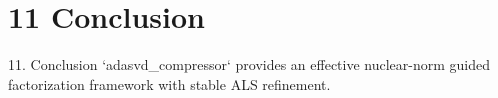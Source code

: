 \section{11 Conclusion}

 11. Conclusion
`adasvd\_compressor` provides an effective nuclear-norm guided factorization framework with stable ALS refinement.
